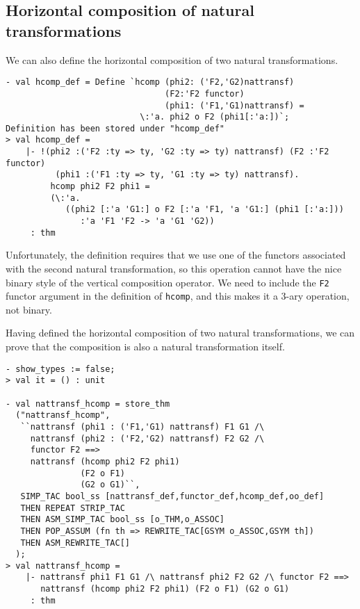 \subsection{Horizontal composition of natural transformations}

We can also define the horizontal composition of two natural transformations.
\begin{session}
\begin{verbatim}
- val hcomp_def = Define `hcomp (phi2: ('F2,'G2)nattransf)
                                (F2:'F2 functor)
                                (phi1: ('F1,'G1)nattransf) =
                           \:'a. phi2 o F2 (phi1[:'a:])`;
Definition has been stored under "hcomp_def"
> val hcomp_def =
    |- !(phi2 :('F2 :ty => ty, 'G2 :ty => ty) nattransf) (F2 :'F2 functor)
          (phi1 :('F1 :ty => ty, 'G1 :ty => ty) nattransf).
         hcomp phi2 F2 phi1 =
         (\:'a.
            ((phi2 [:'a 'G1:] o F2 [:'a 'F1, 'a 'G1:] (phi1 [:'a:]))
               :'a 'F1 'F2 -> 'a 'G1 'G2))
     : thm
\end{verbatim}
\end{session}
Unfortunately, the definition requires that we use one of the functors associated
with the second natural transformation, so this operation cannot have the nice binary
style of the vertical composition operator. We need to include the \texttt{F2} functor
argument in the definition of \texttt{hcomp}, and this makes it a 3-ary operation, not binary.

Having defined the horizontal composition of two natural transformations,
we can prove that the composition is also a natural transformation itself.
\begin{session}
\begin{verbatim}
- show_types := false;
> val it = () : unit

- val nattransf_hcomp = store_thm
  ("nattransf_hcomp",
   ``nattransf (phi1 : ('F1,'G1) nattransf) F1 G1 /\
     nattransf (phi2 : ('F2,'G2) nattransf) F2 G2 /\
     functor F2 ==>
     nattransf (hcomp phi2 F2 phi1)
               (F2 o F1)
               (G2 o G1)``,
   SIMP_TAC bool_ss [nattransf_def,functor_def,hcomp_def,oo_def]
   THEN REPEAT STRIP_TAC
   THEN ASM_SIMP_TAC bool_ss [o_THM,o_ASSOC]
   THEN POP_ASSUM (fn th => REWRITE_TAC[GSYM o_ASSOC,GSYM th])
   THEN ASM_REWRITE_TAC[]
  );
> val nattransf_hcomp =
    |- nattransf phi1 F1 G1 /\ nattransf phi2 F2 G2 /\ functor F2 ==>
       nattransf (hcomp phi2 F2 phi1) (F2 o F1) (G2 o G1)
     : thm
\end{verbatim}
\end{session}

